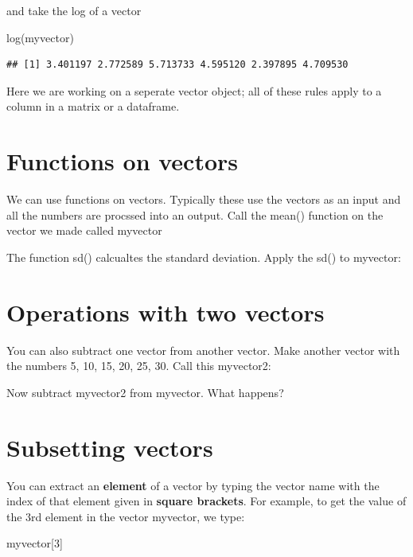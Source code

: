 \documentclass[
]{book}
\newenvironment{Shaded}{\begin{snugshade}}{\end{snugshade}}
\newcommand{\DecValTok}[1]{\textcolor[rgb]{0.00,0.00,0.81}{#1}}
\newcommand{\FunctionTok}[1]{\textcolor[rgb]{0.00,0.00,0.00}{#1}}
\newcommand{\NormalTok}[1]{#1}
\begin{document}
and take the log of a vector

\begin{Shaded}
\begin{Highlighting}[]
\FunctionTok{log}\NormalTok{(myvector)}
\end{Highlighting}
\end{Shaded}

\begin{verbatim}
## [1] 3.401197 2.772589 5.713733 4.595120 2.397895 4.709530
\end{verbatim}

Here we are working on a seperate vector object; all of these rules apply to a column in a matrix or a dataframe.

\hypertarget{functions-on-vectors}{%
\section{Functions on vectors}\label{functions-on-vectors}}

We can use functions on vectors. Typically these use the vectors as an input and all the numbers are procssed into an output. Call the mean() function on the vector we made called myvector

The function sd() calcualtes the standard deviation. Apply the sd() to myvector:

\hypertarget{operations-with-two-vectors}{%
\section{Operations with two vectors}\label{operations-with-two-vectors}}

You can also subtract one vector from another vector. Make another vector with the numbers 5, 10, 15, 20, 25, 30. Call this myvector2:

Now subtract myvector2 from myvector. What happens?

\hypertarget{subsetting-vectors}{%
\section{Subsetting vectors}\label{subsetting-vectors}}

You can extract an \textbf{element} of a vector by typing the vector name with the index of that element given in \textbf{square brackets}. For example, to get the value of the 3rd element in the vector myvector, we type:

\begin{Shaded}
\begin{Highlighting}[]
\NormalTok{myvector[}\DecValTok{3}\NormalTok{]}
\end{Highlighting}
\end{Shaded}
\end{document}

